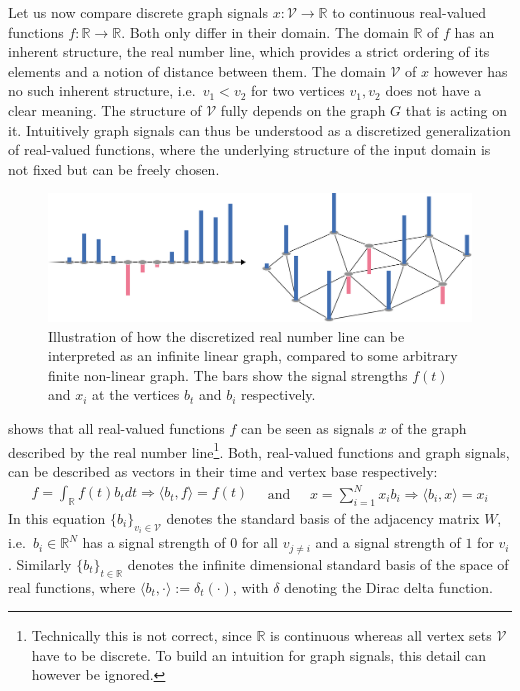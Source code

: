 Let us now compare discrete graph signals $x: \mathcal{V} \to \mathbb{R}$ to continuous real-valued functions $f: \mathbb{R} \to \mathbb{R}$.
Both only differ in their domain.
The domain $\mathbb{R}$ of $f$ has an inherent structure, the real number line, which provides a strict ordering of its elements and a notion of distance between them.
The domain $\mathcal{V}$ of $x$ however has no such inherent structure, i.e.\  $v_1 < v_2$ for two vertices $v_1, v_2$ does not have a clear meaning.
The structure of $\mathcal{V}$ fully depends on the graph $G$ that is acting on it.
Intuitively graph signals can thus be understood as a discretized generalization of real-valued functions, where the underlying structure of the input domain is not fixed but can be freely chosen.
\begin{figure}[ht]
	\centering
	\includegraphics[width=0.8\linewidth]{gfx/sgt/real-graph.pdf}
	\caption{%
		Illustration of how the discretized real number line can be interpreted as an infinite linear graph, compared to some arbitrary finite non-linear graph.
		The bars show the signal strengths $f(t)$ and $x_i$ at the vertices $b_t$ and $b_i$ respectively.
	}\label{fig:sgt:realGraph}
\end{figure}

 shows that all real-valued functions $f$ can be seen as signals $x$ of the graph described by the real number line\footnote{%
	Technically this is not correct, since $\mathbb{R}$ is continuous whereas all vertex sets $\mathcal{V}$ have to be discrete.
	To build an intuition for graph signals, this detail can however be ignored.
}.
Both, real-valued functions and graph signals, can be described as vectors in their time and vertex base respectively:
\begin{equation}
	\begin{split}
		f = \int_{\mathbb{R}} f(t) b_t dt
		\Rightarrow \langle b_t, f \rangle = f(t)
	\end{split}
	\quad\text{and}\quad
	\begin{split}
		x = \sum_{i = 1}^{N} x_i b_i
		\Rightarrow \langle b_i, x \rangle = x_i
	\end{split}
\end{equation}
In this equation ${\{ b_i \}}_{v_i \in \mathcal{V}}$ denotes the standard basis of the adjacency matrix $W$, i.e.\ $b_i \in \mathbb{R}^N$ has a signal strength of $0$ for all $v_{j \neq i}$ and a signal strength of $1$ for $v_i$.
Similarly ${\{ b_t \}}_{t \in \mathbb{R}}$ denotes the infinite dimensional standard basis of the space of real functions, where $\langle b_t, \cdot \rangle := \delta_t(\cdot)$, with $\delta$ denoting the Dirac delta function.

